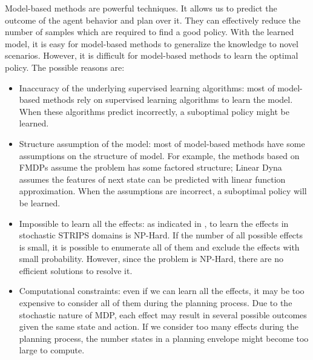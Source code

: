 Model-based methods are powerful techniques. 
It allows us to predict the outcome 
of the agent behavior and plan over it. They can effectively reduce the number of 
samples which are required to find a good policy.
With the learned model, it is easy for model-based methods to generalize
the knowledge to novel scenarios.
However, it is difficult for model-based methods to learn the optimal policy.
The possible reasons are:
\begin{itemize}
\item Inaccuracy of the underlying supervised learning algorithms: most of model-based methods rely on supervised learning algorithms
    to learn the model. When these algorithms predict incorrectly, a suboptimal policy might be learned.
\item Structure assumption of the model: most of model-based methods have some assumptions on the structure of model.
    For example, the methods based on FMDPs assume the problem has some factored structure; Linear Dyna \cite{ApproxDyna} assumes
    the features of next state can be predicted with linear function approximation. When the assumptions are incorrect, a suboptimal policy will be learned.
\item Impossible to learn all the effects: as indicated in \cite{Walsh09}, to learn the effects in stochastic STRIPS domains is NP-Hard.
    If the number of all possible effects is small, it is possible to enumerate all of them and exclude the effects with
    small probability. However, since the problem is NP-Hard, there are no efficient solutions to resolve it.
\item Computational constraints: even if we can learn all the effects, it may be too expensive to consider all of them during
    the planning process. Due to the stochastic nature of MDP, each effect may result in several possible outcomes given
    the same state and action. If we consider too many effects during the planning process, the number states in a planning envelope
    might become too large to compute.
\end{itemize}




